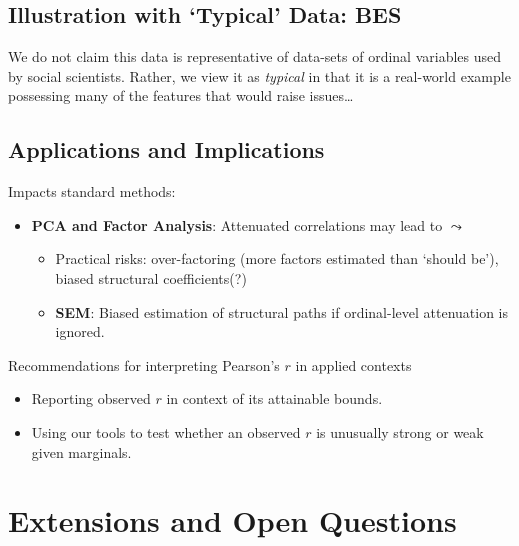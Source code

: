 \documentclass[
  12pt,
]{article}
\providecommand{\tightlist}{%
  \setlength{\itemsep}{0pt}\setlength{\parskip}{0pt}}\usepackage{longtable,booktabs,array}
\theoremstyle{plain}
\theoremstyle{definition}
\theoremstyle{remark}
\begin{document}
\subsection{Illustration with `Typical' Data:
BES}\label{illustration-with-typical-data-bes}

We do not claim this data is representative of data-sets of ordinal
variables used by social scientists. Rather, we view it as
\emph{typical} in that it is a real-world example possessing many of the
features that would raise issues\ldots{}

\subsection{Applications and
Implications}\label{applications-and-implications}

Impacts standard methods:

\begin{itemize}
\tightlist
\item
  \textbf{PCA and Factor Analysis}: Attenuated correlations may lead to
  \(\leadsto\)

  \begin{itemize}
  \item
    Practical risks: over-factoring (more factors estimated than `should
    be'), biased structural coefficients(?)
  \item
    \textbf{SEM}: Biased estimation of structural paths if ordinal-level
    attenuation is ignored.
  \end{itemize}
\end{itemize}

Recommendations for interpreting Pearson's \(r\) in applied contexts

\begin{itemize}
\tightlist
\item
  Reporting observed \(r\) in context of its attainable bounds.
\item
  Using our tools to test whether an observed \(r\) is unusually strong
  or weak given marginals.
\end{itemize}

\section{Extensions and Open
Questions}\label{extensions-and-open-questions}
\end{document}
